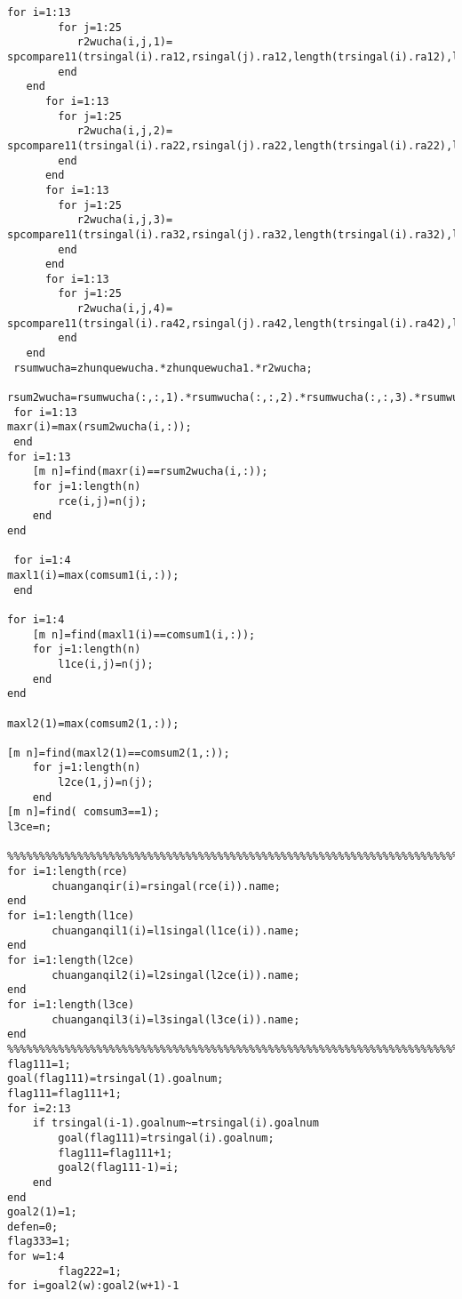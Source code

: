 \begin{appendix}
\begin{lstlisting}[caption=identification.m]
   for i=1:13
        for j=1:25
           r2wucha(i,j,1)= spcompare11(trsingal(i).ra12,rsingal(j).ra12,length(trsingal(i).ra12),length(rsingal(j).ra12));
        end
   end
      for i=1:13
        for j=1:25
           r2wucha(i,j,2)= spcompare11(trsingal(i).ra22,rsingal(j).ra22,length(trsingal(i).ra22),length(rsingal(j).ra22));
        end
      end
      for i=1:13
        for j=1:25
           r2wucha(i,j,3)= spcompare11(trsingal(i).ra32,rsingal(j).ra32,length(trsingal(i).ra32),length(rsingal(j).ra32));
        end
      end
      for i=1:13
        for j=1:25
           r2wucha(i,j,4)= spcompare11(trsingal(i).ra42,rsingal(j).ra42,length(trsingal(i).ra42),length(rsingal(j).ra42));
        end
   end
 rsumwucha=zhunquewucha.*zhunquewucha1.*r2wucha;
 rsum2wucha=rsumwucha(:,:,1).*rsumwucha(:,:,2).*rsumwucha(:,:,3).*rsumwucha(:,:,4);
 for i=1:13
maxr(i)=max(rsum2wucha(i,:));
 end
for i=1:13
    [m n]=find(maxr(i)==rsum2wucha(i,:));
    for j=1:length(n)
        rce(i,j)=n(j);
    end
end

 for i=1:4
maxl1(i)=max(comsum1(i,:));
 end

for i=1:4
    [m n]=find(maxl1(i)==comsum1(i,:));
    for j=1:length(n)
        l1ce(i,j)=n(j);
    end
end

maxl2(1)=max(comsum2(1,:));

[m n]=find(maxl2(1)==comsum2(1,:));
    for j=1:length(n)
        l2ce(1,j)=n(j);
    end
[m n]=find( comsum3==1);
l3ce=n;

%%%%%%%%%%%%%%%%%%%%%%%%%%%%%%%%%%%%%%%%%%%%%%%%%%%%%%%%%%%%%%%%%%%%%%%%%%%%%%%%%%%%%%%%%%%%%%%%%%%%
for i=1:length(rce)
       chuanganqir(i)=rsingal(rce(i)).name;
end
for i=1:length(l1ce)
       chuanganqil1(i)=l1singal(l1ce(i)).name;
end
for i=1:length(l2ce)
       chuanganqil2(i)=l2singal(l2ce(i)).name;
end
for i=1:length(l3ce)
       chuanganqil3(i)=l3singal(l3ce(i)).name;
end
%%%%%%%%%%%%%%%%%%%%%%%%%%%%%%%%%%%%%%%%%%%%%%%%%%%%%%%%%%%%%%%%%%%%%%%%%%%%%%%%%%%%%%%%%%%%%%%%%%%%
flag111=1;
goal(flag111)=trsingal(1).goalnum;
flag111=flag111+1;
for i=2:13
    if trsingal(i-1).goalnum~=trsingal(i).goalnum
        goal(flag111)=trsingal(i).goalnum;
        flag111=flag111+1;
        goal2(flag111-1)=i;
    end
end
goal2(1)=1;
defen=0;
flag333=1;
for w=1:4
        flag222=1;
for i=goal2(w):goal2(w+1)-1


\end{lstlisting}
\end{appendix}
